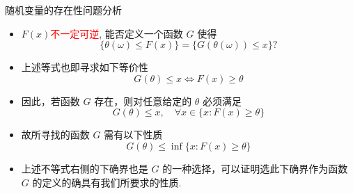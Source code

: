 \documentclass[Prob-All.tex]{subfiles}
\begin{document}
 \begin{frame}{随机变量的存在性问题分析}
	 \begin{itemize}[<+-|alert@+>]
	 \item $F (x)$\textcolor{red}{不一定可逆}, 能否定义一个函数 $G$ 使得
		 \[\{\theta(\omega)\le F(x)\}=\{G(\theta(\omega))\le x\}?\]
	 \item 上述等式也即寻求如下等价性
	 \[G(\theta)\leq x \Leftrightarrow F(x)\ge \theta \]
	 \item 因此，若函数 $G$ 存在，则对任意给定的 $\theta$ 必须满足
	 \[G(\theta)\leq x, \quad  \forall x\in \{x: F(x)\ge\theta\}\]
	 \item 故所寻找的函数 $G$ 需有以下性质
	 \[G(\theta)\leq \inf\{x:F(x)\geq \theta\}\]
	 \item 上述不等式右侧的下确界也是 $G$ 的一种选择，可以证明选此下确界作为函数 $G$ 的定义的确具有我们所要求的性质.%
	 \end{itemize}




 \end{frame}
\end{document}
